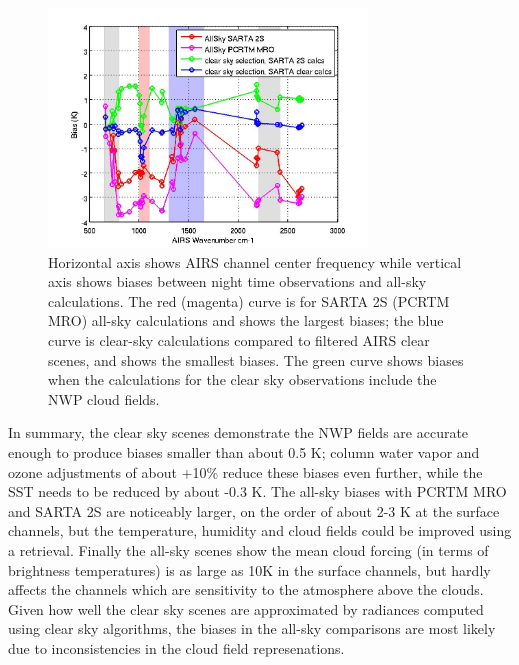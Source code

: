 \documentclass[agupp]{aguplus}              %
\begin{document}
\begin{article}
\begin{figure}[h]
\noindent\includegraphics[width=20pc]{FIGS/ecm_allsky_41chan_biasNstdV2.jpg}
\caption{Horizontal axis shows AIRS channel center frequency while
vertical axis shows biases between night time observations and all-sky
calculations.  The red (magenta) curve is for SARTA 2S (PCRTM MRO) 
all-sky calculations and shows the largest biases;
the blue curve is clear-sky calculations compared to filtered AIRS
clear scenes, and shows the smallest biases. 
The green curve shows biases when the calculations for the clear sky observations include
the NWP cloud fields.}
\label{ecm_allsky_41chan_biasNstd} 
\end{figure}

In summary, the clear sky scenes demonstrate the NWP fields are
accurate enough to produce biases smaller than about 0.5 K; column
water vapor and ozone adjustments of about +10\% reduce these biases
even further, while the SST needs to be reduced by about -0.3 K. The
all-sky biases with PCRTM MRO and SARTA 2S are noticeably larger, on
the order of about 2-3 K at the surface channels, but the temperature,
humidity and cloud fields could be improved using a retrieval. Finally
the all-sky scenes show the mean cloud forcing (in terms of brightness
temperatures) is as large as 10K in the surface channels, but hardly
affects the channels which are sensitivity to the atmosphere above the
clouds. Given how well the clear sky scenes are approximated by
radiances computed using clear sky algorithms, the biases in the
all-sky comparisons are most likely due to inconsistencies in the
cloud field represenations.


\end{article}
\end{document}
